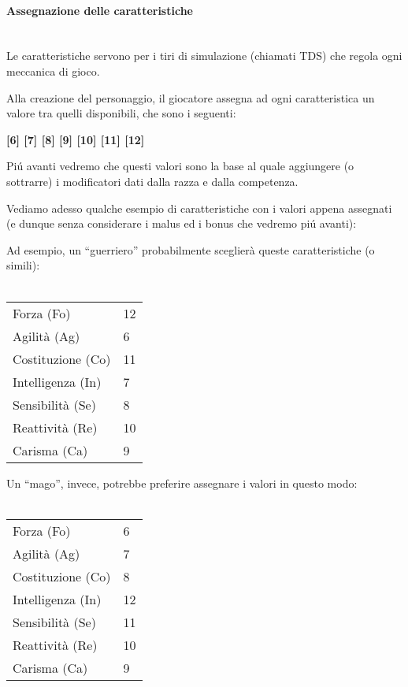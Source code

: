 \documentclass[../manuale_main.tex]{subfiles}
\begin{document}
\clearpage
\paragraph{Assegnazione delle caratteristiche}\mbox{}\\
Le caratteristiche servono per i tiri di simulazione (chiamati TDS) che regola ogni meccanica di gioco.

Alla creazione del personaggio, il giocatore assegna ad ogni caratteristica un valore tra quelli disponibili, che sono i seguenti: 

\textbf{[6] [7] [8] [9] [10] [11] [12]}

Piú avanti vedremo che questi valori sono la base al quale aggiungere (o sottrarre) i modificatori dati dalla razza e dalla competenza.



Vediamo adesso qualche esempio di caratteristiche con i valori appena assegnati (e dunque senza considerare i malus ed i bonus che vedremo piú avanti):

Ad esempio, un ``guerriero'' probabilmente sceglierà queste caratteristiche (o simili):\\\mbox{}\\
\renewcommand{\arraystretch}{1.2}
\begin{tabular}{| l | l |}
\hline
Forza (Fo)&12\\
Agilità (Ag)&6\\
Costituzione (Co)&11\\
Intelligenza (In)&7\\
Sensibilità (Se)&8\\
Reattività (Re)&10\\
Carisma (Ca)&9\\
\hline
\end{tabular}

Un ``mago'', invece, potrebbe preferire assegnare i valori in questo modo:\\\mbox{}\\
\begin{tabular}{| l |l |}
\hline
Forza (Fo)&6\\
Agilità (Ag)&7\\
Costituzione (Co)&8\\
Intelligenza (In)&12\\
Sensibilità (Se)&11\\
Reattività (Re)&10\\
Carisma (Ca)&9\\
\hline
\end{tabular}
\end{document}
